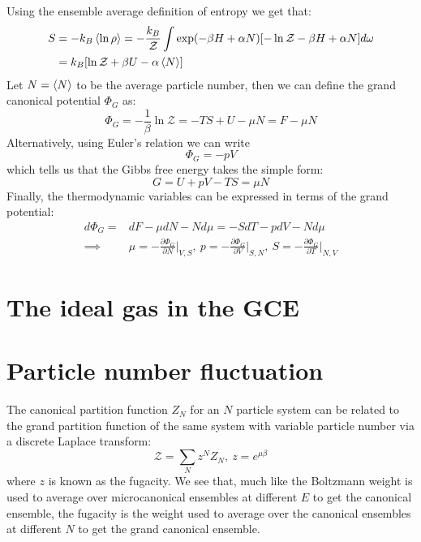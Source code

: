 \documentclass[a4paper,11pt,oneside]{book}
\begin{document}
Using the ensemble average definition of entropy we get that:
\begin{align}
    S &= - k_B \braket{\ln \rho} = -\frac{k_B}{\mathcal{Z}} \int \exp(-\beta H+\alpha N)[-\ln \mathcal{Z}-\beta H + \alpha N] d\omega \\
    &= k_B[\ln \mathcal{Z}+\beta U - \alpha \braket{N}]
\end{align}
Let $N=\braket{N}$ to be the average particle number, then we can define the grand canonical potential $\Phi_G$ as:
\begin{equation}
    \boxed{\Phi_G = -\frac{1}{\beta} \ln \mathcal{Z}=-TS+U-\mu N = F-\mu N}
\end{equation}
Alternatively, using Euler's relation we can write
\begin{equation}
\Phi_G = -pV  
\end{equation}
which tells us that the Gibbs free energy takes the simple form:
\begin{equation}
    G = U + pV - TS = \mu N
\end{equation}
Finally, the thermodynamic variables can be expressed in terms of the grand potential:
\begin{align}
d\Phi_G = & dF - \mu dN -Nd\mu= -SdT-pdV-Nd\mu\\
    \implies & \boxed{\mu = -\frac{\partial \Phi_G}{\partial N}\bigg|_{V,S}, \ p = -\frac{\partial \Phi_G}{\partial V}\bigg|_{S,N}, \ S = -\frac{\partial \Phi_G}{\partial T}\bigg|_{N,V}}
\end{align}
\section{The ideal gas in the GCE}

\section{Particle number fluctuation}
The canonical partition function $Z_N$ for an $N$ particle system can be related to the grand partition function of the same system with variable particle number via a discrete Laplace transform:
\begin{equation}
    \boxed{\mathcal{Z} = \sum_N z^N Z_N, \ z=e^{\mu \beta}}
\end{equation}
where $z$ is known as the fugacity. We see that, much like the Boltzmann weight is used to average over microcanonical ensembles at different $E$ to get the canonical ensemble, the fugacity is the weight used to average over the canonical ensembles at different $N$ to get the grand canonical ensemble. 
\end{document}
